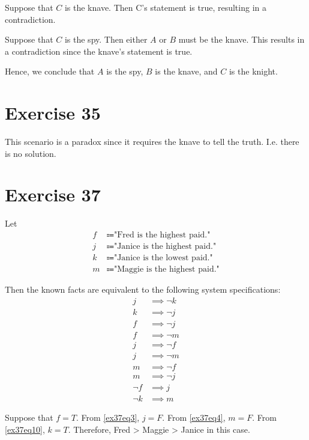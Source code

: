 \documentclass{article}
\begin{document}
Suppose that $C$ is the knave. Then C's statement is true, resulting in a contradiction.

Suppose that $C$ is the spy. Then either $A$ or $B$ must be the knave. This results in a contradiction since the knave's statement is true.

Hence, we conclude that $A$ is the spy, $B$ is the knave, and $C$ is the knight.

\pagebreak

\section{Exercise 35}
This scenario is a paradox since it requires the knave to tell the truth. I.e. there is no solution.

\pagebreak

\section{Exercise 37}
Let
\begin{align*}
	f & \Coloneqq \text{"Fred is the highest paid."}   \\
	j & \Coloneqq \text{"Janice is the highest paid."} \\
	k & \Coloneqq \text{"Janice is the lowest paid."}  \\
	m & \Coloneqq \text{"Maggie is the highest paid."}
\end{align*}

Then the known facts are equivalent to the following system specifications:
\begin{align}
	j      & \implies \neg k \label{ex37eq1} \\
	k      & \implies \neg j \label{ex37eq2} \\
	f      & \implies \neg j \label{ex37eq3} \\
	f      & \implies \neg m \label{ex37eq4} \\
	j      & \implies \neg f \label{ex37eq5} \\
	j      & \implies \neg m \label{ex37eq6} \\
	m      & \implies \neg f \label{ex37eq7} \\
	m      & \implies \neg j \label{ex37eq8} \\
	\neg f & \implies j \label{ex37eq9}      \\
	\neg k & \implies m \label{ex37eq10}
\end{align}

Suppose that $f = T$. From \eqref{ex37eq3}, $j = F$. From \eqref{ex37eq4}, $m = F$. From \eqref{ex37eq10}, $k = T$. Therefore, Fred > Maggie > Janice in this case.
\end{document}
